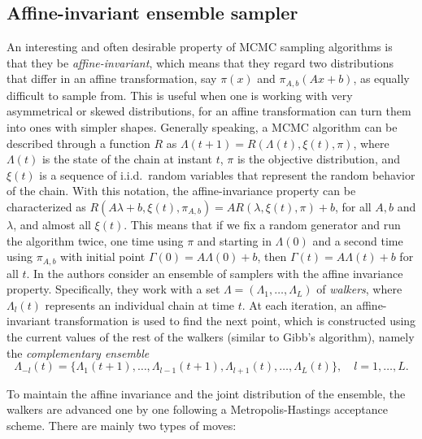 \subsection{Affine-invariant ensemble sampler}\label{app:ensemble-sampler}

An interesting and often desirable property of MCMC sampling algorithms is that they be \textit{affine-invariant}, which means that they regard two distributions that differ in an affine transformation, say \(\pi(x)\) and \(\pi_{A, b}(Ax + b)\), as equally difficult to sample from. This is useful when one is working with very asymmetrical or skewed distributions, for an affine transformation can turn them into ones with simpler shapes. Generally speaking, a MCMC algorithm can be described through a function \(R\) as \(\Lambda(t+1)=R(\Lambda(t), \xi(t), \pi)\), where \(\Lambda(t)\) is the state of the chain at instant \(t\), \(\pi\) is the objective distribution, and \(\xi(t)\) is a sequence of i.i.d.\ random variables that represent the random behavior of the chain. With this notation, the affine-invariance property can be characterized as \(R(A\lambda+b, \xi(t), \pi_{A,b}) = AR(\lambda, \xi(t), \pi) + b\), for all \(A,b\) and \(\lambda\), and almost all \(\xi(t)\). This means that if we fix a random generator and run the algorithm twice, one time using \(\pi\) and starting in \(\Lambda(0)\) and a second time using \(\pi_{A,b}\) with initial point \(\Gamma(0)=A\Lambda(0)+b\), then \(\Gamma(t)=A\Lambda(t)+b\) for all \(t\). In \citet{goodman2010ensemble} the authors consider an ensemble of samplers with the affine invariance property. Specifically, they work with a set \(\Lambda=(\Lambda_1, \dots, \Lambda_L)\) of \textit{walkers}, where \(\Lambda_l(t)\) represents an individual chain at time \(t\). At each iteration, an affine-invariant transformation is used to find the next point, which is constructed using the current values of the rest of the walkers (similar to Gibb's algorithm), namely the \textit{complementary ensemble}
\[
    \Lambda_{-l}(t) = \{\Lambda_1(t+1), \dots, \Lambda_{l-1}(t+1), \Lambda_{l+1}(t), \dots, \Lambda_L(t)\}, \quad l=1,\dots, L.
\]

To maintain the affine invariance and the joint distribution of the ensemble, the walkers are advanced one by one following a Metropolis-Hastings acceptance scheme. There are mainly two types of moves:

